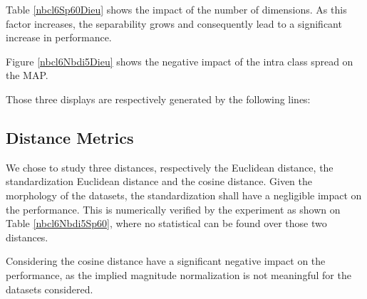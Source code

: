 \documentclass[12pt,a4paper,fleqn]{tufte-handout}
\begin{document}
Table \ref{nbcl6Sp60Dieu} shows the impact of the number of dimensions. As this factor increases, the separability grows and consequently lead to a significant increase in performance.

Figure \ref{nbcl6Nbdi5Dieu} shows the negative impact of the intra class spread on the MAP.

Those three displays are respectively generated by the following lines:


\subsection{Distance Metrics}

We chose to study three distances, respectively the Euclidean distance, the standardization Euclidean distance and the cosine distance. Given the morphology of the datasets, the standardization shall have a negligible impact on the performance. This is numerically verified by the experiment as shown on Table \ref{nbcl6Nbdi5Sp60}, where no statistical  can be found over those two distances. 

Considering the cosine distance have a significant negative impact on the performance, as the implied magnitude normalization is not meaningful for the datasets considered.
  
  
  
 
 
  
\end{document}
